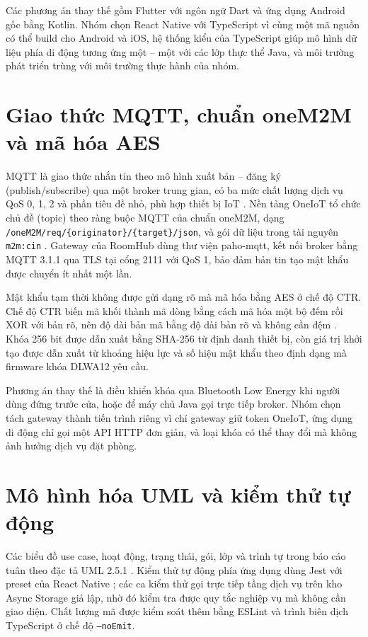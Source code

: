 \documentclass[../DoAn.tex]{subfiles}
\begin{document}
Các phương án thay thế gồm Flutter với ngôn ngữ Dart và ứng dụng Android gốc bằng Kotlin. Nhóm chọn React Native với TypeScript vì cùng một mã nguồn có thể build cho Android và iOS, hệ thống kiểu của TypeScript giúp mô hình dữ liệu phía di động tương ứng một -- một với các lớp thực thể Java, và môi trường phát triển trùng với môi trường thực hành của nhóm.

\section{Giao thức MQTT, chuẩn oneM2M và mã hóa AES}
\label{section:3.6}
MQTT là giao thức nhắn tin theo mô hình xuất bản -- đăng ký (publish/subscribe) qua một broker trung gian, có ba mức chất lượng dịch vụ QoS 0, 1, 2 và phần tiêu đề nhỏ, phù hợp thiết bị IoT \cite{mqtt5}. Nền tảng OneIoT tổ chức chủ đề (topic) theo ràng buộc MQTT của chuẩn oneM2M, dạng \texttt{/oneM2M/req/\{originator\}/\{target\}/json}, và gói dữ liệu trong tài nguyên \texttt{m2m:cin} \cite{onem2mmqtt}. Gateway của RoomHub dùng thư viện paho-mqtt, kết nối broker bằng MQTT 3.1.1 qua TLS tại cổng 2111 với QoS 1, bảo đảm bản tin tạo mật khẩu được chuyển ít nhất một lần.

Mật khẩu tạm thời không được gửi dạng rõ mà mã hóa bằng AES ở chế độ CTR. Chế độ CTR biến mã khối thành mã dòng bằng cách mã hóa một bộ đếm rồi XOR với bản rõ, nên độ dài bản mã bằng độ dài bản rõ và không cần đệm \cite{dworkin2001sp80038a}. Khóa 256 bit được dẫn xuất bằng SHA-256 từ định danh thiết bị, còn giá trị khởi tạo được dẫn xuất từ khoảng hiệu lực và số hiệu mật khẩu theo định dạng mà firmware khóa DLWA12 yêu cầu.

Phương án thay thế là điều khiển khóa qua Bluetooth Low Energy khi người dùng đứng trước cửa, hoặc để máy chủ Java gọi trực tiếp broker. Nhóm chọn tách gateway thành tiến trình riêng vì chỉ gateway giữ token OneIoT, ứng dụng di động chỉ gọi một API HTTP đơn giản, và loại khóa có thể thay đổi mà không ảnh hưởng dịch vụ đặt phòng.

\section{Mô hình hóa UML và kiểm thử tự động}
\label{section:3.7}
Các biểu đồ use case, hoạt động, trạng thái, gói, lớp và trình tự trong báo cáo tuân theo đặc tả UML 2.5.1 \cite{uml251}. Kiểm thử tự động phía ứng dụng dùng Jest với preset của React Native \cite{jest}; các ca kiểm thử gọi trực tiếp tầng dịch vụ trên kho Async Storage giả lập, nhờ đó kiểm tra được quy tắc nghiệp vụ mà không cần giao diện. Chất lượng mã được kiểm soát thêm bằng ESLint và trình biên dịch TypeScript ở chế độ \texttt{--noEmit}.
\end{document}
